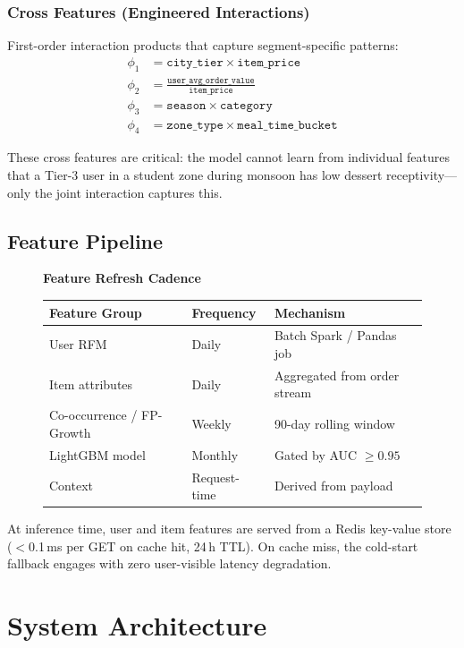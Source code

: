 \documentclass[conference]{IEEEtran}
\begin{document}
\subsubsection{Cross Features (Engineered Interactions)}
First-order interaction products that capture segment-specific patterns:
\begin{align}
  \phi_1 &= \texttt{city\_tier} \times \texttt{item\_price} \\
  \phi_2 &= \frac{\texttt{user\_avg\_order\_value}}{\texttt{item\_price}} \\
  \phi_3 &= \texttt{season} \times \texttt{category} \\
  \phi_4 &= \texttt{zone\_type} \times \texttt{meal\_time\_bucket}
\end{align}

These cross features are critical: the model cannot learn from individual
features that a Tier-3 user in a student zone during monsoon has low dessert
receptivity---only the joint interaction captures this.

\subsection{Feature Pipeline}

\begin{figure}[h]
\centering
\textbf{Feature Refresh Cadence}\\[4pt]
\begin{tabular}{lll}
\toprule
Feature Group & Frequency & Mechanism \\
\midrule
User RFM & Daily & Batch Spark / Pandas job \\
Item attributes & Daily & Aggregated from order stream \\
Co-occurrence / FP-Growth & Weekly & 90-day rolling window \\
LightGBM model & Monthly & Gated by AUC $\geq 0.95$ \\
Context & Request-time & Derived from payload \\
\bottomrule
\end{tabular}
\end{figure}

At inference time, user and item features are served from a Redis key-value
store ($<$0.1\,ms per GET on cache hit, 24\,h TTL). On cache miss, the
cold-start fallback engages with zero user-visible latency degradation.


\section{System Architecture}
\end{document}
